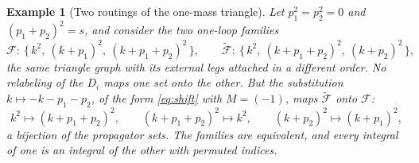 \documentclass[11pt]{article}
\newtheorem{example}[definition]{Example}
\begin{document}
\begin{example}[Two routings of the one-mass triangle]
\label{ex:shift}
Let $p_1^2 = p_2^2 = 0$ and $(p_1+p_2)^2 = s$, and consider the two
one-loop families
\begin{equation}
  \mathcal{F}:\ \{\,k^2,\ (k+p_1)^2,\ (k+p_1+p_2)^2\,\},
  \qquad
  \widetilde{\mathcal{F}}:\ \{\,k^2,\ (k+p_1+p_2)^2,\ (k+p_2)^2\,\},
\end{equation}
the same triangle graph with its external legs attached in a
different order.  No relabeling of the $D_i$ maps one set onto the
other.  But the substitution $k \mapsto -k - p_1 - p_2$, of the
form \eqref{eq:shift} with $M = (-1)$, maps
$\widetilde{\mathcal{F}}$ onto $\mathcal{F}$:
\begin{equation}
  k^2 \mapsto (k+p_1+p_2)^2, \qquad
  (k+p_1+p_2)^2 \mapsto k^2, \qquad
  (k+p_2)^2 \mapsto (k+p_1)^2 ,
\end{equation}
a bijection of the propagator sets.  The families are equivalent,
and every integral of one is an integral of the other with permuted
indices.
\end{example}
\end{document}
